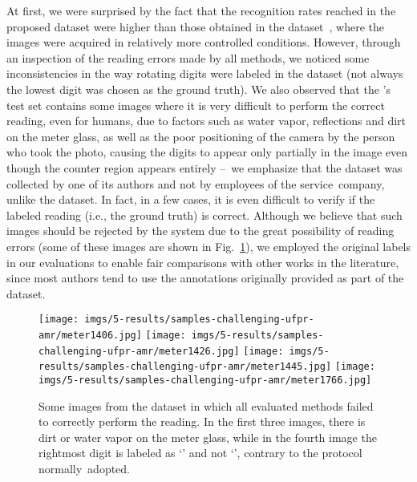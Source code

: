 At first, we were surprised by the fact that the recognition rates reached in the proposed dataset were higher than those obtained in the \ufpramr dataset~\cite{laroca2019convolutional}, where the images were acquired in relatively more controlled conditions.
However, through an inspection of the reading errors made by all methods, we noticed some inconsistencies in the way rotating digits were labeled in the \ufpramr dataset (not always the lowest digit was chosen as the ground truth).
We also observed that the \ufpramr's test set contains some images where it is very difficult to perform the correct reading, even for humans, due to factors such as water vapor, reflections and dirt on the meter glass, as well as the poor positioning of the camera by the person who took the photo, causing the digits to appear only partially in the image even though the counter region appears entirely --~we emphasize that the \ufpramr dataset was collected by one of its authors and not by employees of the service~company, unlike the \dataset dataset.
In fact, in a few cases, it is even difficult to verify if the labeled reading (i.e., the ground truth) is correct.
Although we believe that such images should be rejected by the system due to the great possibility of reading errors (some of these images are shown in Fig.~\ref{fig:samples-challenging-ufpr-amr}), we employed the original labels in our evaluations to enable fair comparisons with other works in the literature, since most authors tend to use the annotations originally provided as part of the dataset.

\begin{figure}[!htb]
    \centering
    \texttt{[image: imgs/5-results/samples-challenging-ufpr-amr/meter1406.jpg]} 
    \texttt{[image: imgs/5-results/samples-challenging-ufpr-amr/meter1426.jpg]} 
    \texttt{[image: imgs/5-results/samples-challenging-ufpr-amr/meter1445.jpg]} 
    \texttt{[image: imgs/5-results/samples-challenging-ufpr-amr/meter1766.jpg]}
    
    \vspace{-1.25mm}
    
    \caption{\small Some images from the \ufpramr dataset in which all evaluated methods failed to correctly perform the reading.
    In the first three images, there is dirt or water vapor on the meter glass, while in the fourth image the rightmost digit is labeled as `' and not `', contrary to the protocol normally~adopted.}
    \label{fig:samples-challenging-ufpr-amr}
\end{figure}

